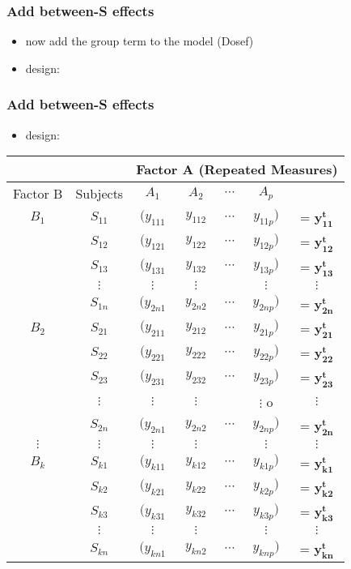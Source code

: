 \begin{frame}[fragile]\frametitle{Add between-S effects}
  \begin{itemize}
  \item now add the group term to the model (Dosef)
  \item design:
  \end{itemize}\scriptsize
\end{frame}

\begin{frame}[fragile]\frametitle{Add between-S effects}
  \begin{itemize}
  \item design:
  \end{itemize}\scriptsize
  \begin{center}
    \begin{tabular}{c c c c c c c}
      & & \multicolumn{5}{c}{Factor A (Repeated Measures)} \\ \hline
Factor B & Subjects & $A_1$ & $A_2$ & $\cdots$ & $A_p$ & \\
$B_1$ & $S_{11}$ & $( y_{111}$ & $y_{112}$ & $\cdots$ & $y_{11p} )$ & = $\mathbf{y^t_{11}}$ \\
      & $S_{12}$ & $( y_{121}$ & $y_{122}$ & $\cdots$ & $y_{12p} )$ & = $\mathbf{y^t_{12}}$ \\
      & $S_{13}$ & $( y_{131}$ & $y_{132}$ & $\cdots$ & $y_{13p} )$ & = $\mathbf{y^t_{13}}$ \\
      & $\vdots$ & $\vdots$ & $\vdots$ &  & $ \vdots$ & $ \vdots $ \\
      & $S_{1n}$ & $( y_{2n1}$ & $y_{2n2}$ & $\cdots$ & $y_{2np} )$ & = $\mathbf{y^t_{2n}}$ \\
$B_2$ & $S_{21}$ & $( y_{211}$ & $y_{212}$ & $\cdots$ & $y_{21p} )$ & = $\mathbf{y^t_{21}}$ \\
      & $S_{22}$ & $( y_{221}$ & $y_{222}$ & $\cdots$ & $y_{22p} )$ & = $\mathbf{y^t_{22}}$ \\
      & $S_{23}$ & $( y_{231}$ & $y_{232}$ & $\cdots$ & $y_{23p} )$ & = $\mathbf{y^t_{23}}$ \\
      & $\vdots$ & $\vdots$ & $\vdots$ &  & $ \vdots$ o& $ \vdots $ \\
      & $S_{2n}$ & $( y_{2n1}$ & $y_{2n2}$ & $\cdots$ & $y_{2np} )$ & = $\mathbf{y^t_{2n}}$ \\
$\vdots$  & $\vdots$ & $\vdots$ & $\vdots$ &  & $ \vdots$ & $ \vdots $ \\
$B_k$ & $S_{k1}$ & $( y_{k11}$ & $y_{k12}$ & $\cdots$ & $y_{k1p} )$ & = $\mathbf{y^t_{k1}}$ \\
      & $S_{k2}$ & $( y_{k21}$ & $y_{k22}$ & $\cdots$ & $y_{k2p} )$ & = $\mathbf{y^t_{k2}}$ \\
      & $S_{k3}$ & $( y_{k31}$ & $y_{k32}$ & $\cdots$ & $y_{k3p} )$ & = $\mathbf{y^t_{k3}}$ \\
      & $\vdots$ & $\vdots$ & $\vdots$ &  & $ \vdots$ & $ \vdots $ \\
      & $S_{kn}$ & $( y_{kn1}$ & $y_{kn2}$ & $\cdots$ & $y_{knp} )$ & = $\mathbf{y^t_{kn}}$ \\
    \end{tabular}
  \end{center}
\end{frame}



